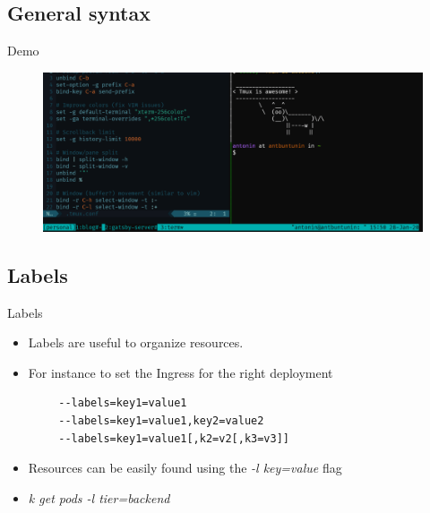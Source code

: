 \documentclass{beamer}
\begin{document}
\subsection{General syntax}

\begin{frame}{Demo}

\begin{figure}
    \centering
    \includegraphics[scale=0.35]{tmux.png}
\end{figure}

\end{frame}

\subsection{Labels}

\begin{frame}[fragile]{Labels}
    \begin{itemize}
        \item Labels are useful to organize resources.
        \item For instance to set the Ingress for the right deployment
    \end{itemize}
    
    \begin{lstlisting}
        --labels=key1=value1
        --labels=key1=value1,key2=value2
        --labels=key1=value1[,k2=v2[,k3=v3]]
        \end{lstlisting}
    
    \begin{itemize}
        \item Resources can be easily found using the \textit{-l key=value} flag
        \item \textit{k get pods -l tier=backend}
    \end{itemize}
    
\end{frame}
\end{document}
